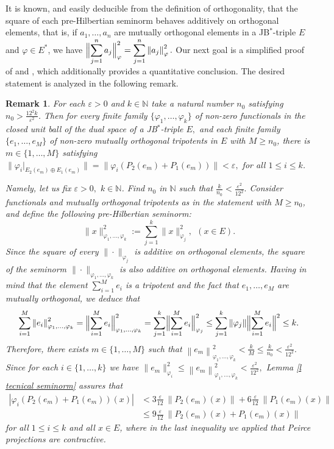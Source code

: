 \documentclass[10pt]{amsart}
\newtheorem{remark}[theorem]{Remark}
\begin{document}
	It is known, and easily deducible from the definition of orthogonality, that the square of each pre-Hilbertian seminorm behaves additively on orthogonal elements, that is, if $a_1,\ldots, a_n$ are mutually orthogonal elements in a JB$^*$-triple $E$ and $\varphi\in E^*$, we have $\displaystyle\Bigl\| \sum_{j=1}^n a_j \Bigr\|_{\varphi}^2 =  \sum_{j=1}^n \left\|a_j\right\|_{\varphi}^2.$ Our next goal is a simplified proof of \cite[Lemma~4.16]{MarOikh2004} and \cite[Lemma~3.3]{Santos2014}, which additionally provides a quantitative conclusion. The desired statement is analyzed in the following remark.
	
	
	\begin{remark}\label{r simplified statement and proof of OM and Sant} For each $\varepsilon >0$ and $k\in \mathbb{N}$ take a natural number $n_0$ satisfying $n_0 > \frac{12^2 k}{\varepsilon^2}$. Then for every finite family $\{\varphi_1,\ldots, \varphi_k\}$ of non-zero functionals in the closed unit ball of the dual space of a JB$^*$-triple $E,$ and each finite family $\{e_1,\ldots, e_M\}$ of non-zero mutually orthogonal tripotents in $E$ with $M\geq n_0$, there is $m\in \{1,\ldots, M\}$ satisfying $\|\varphi_i|_{E_2(e_m)\oplus E_1(e_m)}\| = \|\varphi_i (P_2(e_m)+ P_1(e_m))\|< \varepsilon,$ for all $1\leq i \leq k$.
		
		Namely, let us fix $\varepsilon>0,$ $k\in \mathbb{N}$. Find $n_0$ in $\mathbb{N}$ such that $\frac{k}{n_0}<\frac{\varepsilon^2}{12^2}.$ Consider functionals and mutually orthogonal tripotents as in the statement with $M\geq n_0$, and define the following pre-Hilbertian seminorm:
		$$
		\|x\|_{\varphi_1,\ldots, \varphi_k}^2 := \sum_{j=1}^k \|x\|_{\varphi_j}^2, \ \ (x\in E).
		$$
		Since the square of every $\|\cdot\|_{\varphi_j}$ is additive on orthogonal elements, the square of the seminorm $\|\cdot\|_{\varphi_1,\ldots, \varphi_k}$ is also additive on orthogonal elements. Having in mind that the element $\sum_{i=1}^M e_i$ is a tripotent and the fact that $e_1,\ldots, e_M$ are mutually orthogonal, we deduce that
		$$ \sum_{i=1}^M  \left\| e_i \right\|_{\varphi_1,\ldots, \varphi_k}^2 = \Bigl\| \sum_{i=1}^M e_i \Bigr\|^2_{\varphi_1,\ldots, \varphi_k} = \sum_{j=1}^k \Bigl\| \sum_{i=1}^M e_i \Bigr\|^{2}_{\varphi_j} \leq \sum_{j=1}^k \|\varphi_j\| \Bigl\| \sum_{i=1}^M e_i  \Bigr\|^2 \leq k .
		$$
		Therefore, there exists $m\in \{1,\ldots, M\}$ such that $\left\| e_m \right\|_{\varphi_1,\ldots, \varphi_k}^2 <\frac{k}{M} \leq \frac{k}{n_0} < \frac{\varepsilon^2}{12^2}.$ Since for each $i \in \{1, \ldots, k\}$ we have $\|e_m\|_{\varphi_i}^2 \leq \left\| e_m \right\|_{\varphi_1,\ldots, \varphi_k}^2< \frac{\varepsilon^2}{12^2},$ Lemma \ref{l tecnical seminorm} assures that \[\begin{aligned}|\varphi_i \left(P_2 (e_m) + P_1 (e_m)\right) (x)| &< 3 \frac{\varepsilon}{12} \ \left\|P_2 (e_m) (x)\right\|+ 6 \frac{\varepsilon}{12} \ \left\|P_1 (e_m)
			(x)\right\| \\
			&\leq 9 \frac{\varepsilon}{12} \ \left\|P_2 (e_m) (x) + P_1 (e_m) (x)\right\|
		\end{aligned}\] for all $1\leq i\leq k$ and all $x\in E$, where in the last inequality we applied that Peirce projections are contractive.
	\end{remark}
\end{document}
